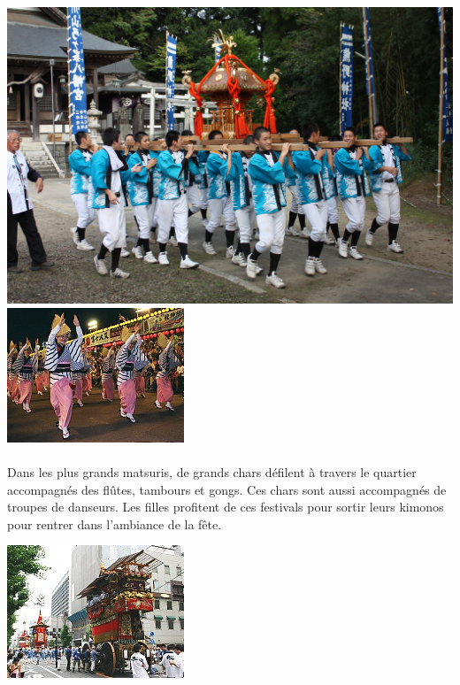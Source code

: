 \begin{center}
	\includegraphics[scale=0.07]{mikoshi.jpg}
	\includegraphics[scale=1.3]{odori.jpg}
\end{center}

\paragraph{} Dans les plus grands matsuris, de grands chars défilent à travers
le quartier accompagnés des flûtes, tambours et gongs. Ces chars sont aussi
accompagnés de troupes de danseurs. Les filles profitent de ces festivals pour
sortir leurs kimonos pour rentrer dans l’ambiance de la fête.

\begin{center}
	\includegraphics[scale=1.3]{gion.jpg}
\end{center}

\newpage

